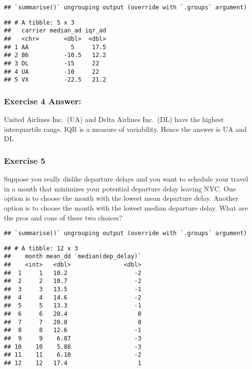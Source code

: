 \documentclass[
]{article}
\newenvironment{Shaded}{\begin{snugshade}}{\end{snugshade}}
\newcommand{\DataTypeTok}[1]{\textcolor[rgb]{0.13,0.29,0.53}{#1}}
\newcommand{\KeywordTok}[1]{\textcolor[rgb]{0.13,0.29,0.53}{\textbf{#1}}}
\newcommand{\NormalTok}[1]{#1}
\newcommand{\OperatorTok}[1]{\textcolor[rgb]{0.81,0.36,0.00}{\textbf{#1}}}
\newcommand{\StringTok}[1]{\textcolor[rgb]{0.31,0.60,0.02}{#1}}
\begin{document}
\begin{verbatim}
## `summarise()` ungrouping output (override with `.groups` argument)
\end{verbatim}

\begin{verbatim}
## # A tibble: 5 x 3
##   carrier median_ad iqr_ad
##   <chr>       <dbl>  <dbl>
## 1 AA            5     17.5
## 2 B6          -10.5   12.2
## 3 DL          -15     22  
## 4 UA          -10     22  
## 5 VX          -22.5   21.2
\end{verbatim}

\hypertarget{exercise-4-answer}{%
\subsubsection{\texorpdfstring{\textbf{Exercise 4
Answer:}}{Exercise 4 Answer:}}\label{exercise-4-answer}}

United Airlines Inc.~(UA) and Delta Airlines Inc.~(DL) have the highest
interquartile range. IQR is a measure of variability. Hence the answer
is UA and DL

\hypertarget{exercise-5}{%
\subsubsection{Exercise 5}\label{exercise-5}}

Suppose you really dislike departure delays and you want to schedule
your travel in a month that minimizes your potential departure delay
leaving NYC. One option is to choose the month with the lowest mean
departure delay. Another option is to choose the month with the lowest
median departure delay. What are the pros and cons of these two choices?

\begin{Shaded}
\end{Shaded}

\begin{verbatim}
## `summarise()` ungrouping output (override with `.groups` argument)
\end{verbatim}

\begin{verbatim}
## # A tibble: 12 x 3
##    month mean_dd `median(dep_delay)`
##    <int>   <dbl>               <dbl>
##  1     1   10.2                   -2
##  2     2   10.7                   -2
##  3     3   13.5                   -1
##  4     4   14.6                   -2
##  5     5   13.3                   -1
##  6     6   20.4                    0
##  7     7   20.8                    0
##  8     8   12.6                   -1
##  9     9    6.87                  -3
## 10    10    5.88                  -3
## 11    11    6.10                  -2
## 12    12   17.4                    1
\end{verbatim}
\end{document}
